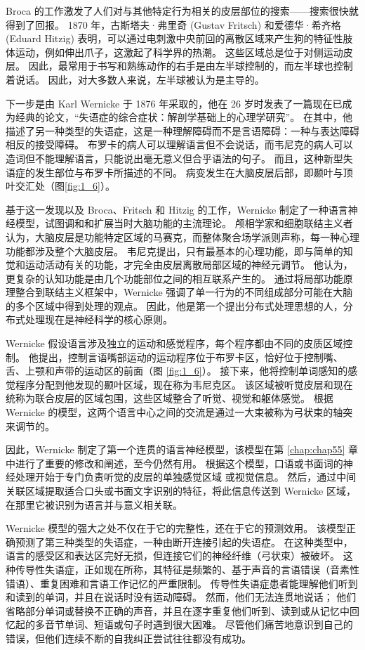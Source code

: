 Broca 的工作激发了人们对与其他特定行为相关的皮层部位的搜索——搜索很快就得到了回报。 
1870 年，古斯塔夫·弗里奇 (Gustav Fritsch) 和爱德华·希齐格 (Eduard Hitzig) 表明，可以通过电刺激中央前回的离散区域来产生狗的特征性肢体运动，例如伸出爪子，这激起了科学界的热潮。 
这些区域总是位于对侧运动皮层。 
因此，最常用于书写和熟练动作的右手是由左半球控制的，而左半球也控制着说话。 
因此，对大多数人来说，左半球被认为是主导的。


下一步是由 Karl Wernicke 于 1876 年采取的，他在 26 岁时发表了一篇现在已成为经典的论文，“失语症的综合症状：解剖学基础上的心理学研究”。 
在其中，他描述了另一种类型的失语症，这是一种理解障碍而不是言语障碍：一种与表达障碍相反的接受障碍。 布罗卡的病人可以理解语言但不会说话，而韦尼克的病人可以造词但不能理解语言，只能说出毫无意义但合乎语法的句子。 
而且，这种新型失语症的发生部位与布罗卡所描述的不同。 
病变发生在大脑皮层后部，即颞叶与顶叶交汇处（图\ref{fig:1_6}）。


基于这一发现以及 Broca、Fritsch 和 Hitzig 的工作，Wernicke 制定了一种语言神经模型，试图调和和扩展当时大脑功能的主流理论。 
颅相学家和细胞联结主义者认为，大脑皮层是功能特定区域的马赛克，而整体聚合场学派则声称，每一种心理功能都涉及整个大脑皮层。 
韦尼克提出，只有最基本的心理功能，即与简单的知觉和运动活动有关的功能，才完全由皮层离散局部区域的神经元调节。 
他认为，更复杂的认知功能是由几个功能部位之间的相互联系产生的。 
通过将局部功能原理整合到联结主义框架中，Wernicke 强调了单一行为的不同组成部分可能在大脑的多个区域中得到处理的观点。 
因此，他是第一个提出分布式处理思想的人，分布式处理现在是神经科学的核心原则。


Wernicke 假设语言涉及独立的运动和感觉程序，每个程序都由不同的皮质区域控制。 
他提出，控制言语嘴部运动的运动程序位于布罗卡区，恰好位于控制嘴、舌、上颚和声带的运动区的前面（图 \ref{fig:1_6}）。 
接下来，他将控制单词感知的感觉程序分配到他发现的颞叶区域，现在称为韦尼克区。 
该区域被听觉皮层和现在统称为联合皮层的区域包围，这些区域整合了听觉、视觉和躯体感觉。 
根据 Wernicke 的模型，这两个语言中心之间的交流是通过一大束被称为弓状束的轴突来调节的。


因此，Wernicke 制定了第一个连贯的语言神经模型，该模型在第 \ref{chap:chap55} 章中进行了重要的修改和阐述，至今仍然有用。
根据这个模型，口语或书面词的神经处理开始于专门负责听觉的皮层的单独感觉区域 或视觉信息。 
然后，通过中间关联区域提取适合口头或书面文字识别的特征，将此信息传送到 Wernicke 区域，在那里它被识别为语言并与意义相关联。


Wernicke 模型的强大之处不仅在于它的完整性，还在于它的预测效用。 
该模型正确预测了第三种类型的失语症，一种由断开连接引起的失语症。 
在这种类型中，语言的感受区和表达区完好无损，但连接它们的神经纤维（弓状束）被破坏。 
这种传导性失语症，正如现在所称，其特征是频繁的、基于声音的言语错误（音素性错语）、重复困难和言语工作记忆的严重限制。 
传导性失语症患者能理解他们听到和读到的单词，并且在说话时没有运动障碍。 
然而，他们无法连贯地说话； 他们省略部分单词或替换不正确的声音，并且在逐字重复他们听到、读到或从记忆中回忆起的多音节单词、短语或句子时遇到很大困难。 
尽管他们痛苦地意识到自己的错误，但他们连续不断的自我纠正尝试往往都没有成功。


